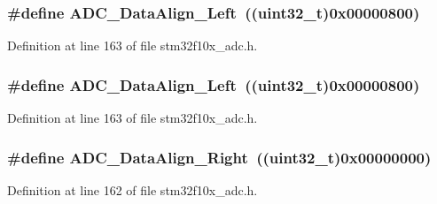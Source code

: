 \subsubsection[{\texorpdfstring{A\+D\+C\+\_\+\+Data\+Align\+\_\+\+Left}{ADC_DataAlign_Left}}]{\setlength{\rightskip}{0pt plus 5cm}\#define A\+D\+C\+\_\+\+Data\+Align\+\_\+\+Left~(({\bf uint32\+\_\+t})0x00000800)}\hypertarget{group___a_d_c__data__align_ga87c2b7021bc288174d5d6175dc267251}{}\label{group___a_d_c__data__align_ga87c2b7021bc288174d5d6175dc267251}


Definition at line 163 of file stm32f10x\+\_\+adc.\+h.

\subsubsection[{\texorpdfstring{A\+D\+C\+\_\+\+Data\+Align\+\_\+\+Left}{ADC_DataAlign_Left}}]{\setlength{\rightskip}{0pt plus 5cm}\#define A\+D\+C\+\_\+\+Data\+Align\+\_\+\+Left~(({\bf uint32\+\_\+t})0x00000800)}\hypertarget{group___a_d_c__data__align_ga87c2b7021bc288174d5d6175dc267251}{}\label{group___a_d_c__data__align_ga87c2b7021bc288174d5d6175dc267251}


Definition at line 163 of file stm32f10x\+\_\+adc.\+h.

\subsubsection[{\texorpdfstring{A\+D\+C\+\_\+\+Data\+Align\+\_\+\+Right}{ADC_DataAlign_Right}}]{\setlength{\rightskip}{0pt plus 5cm}\#define A\+D\+C\+\_\+\+Data\+Align\+\_\+\+Right~(({\bf uint32\+\_\+t})0x00000000)}\hypertarget{group___a_d_c__data__align_ga80b5d2f2b6b058bc498f58e0a92ad035}{}\label{group___a_d_c__data__align_ga80b5d2f2b6b058bc498f58e0a92ad035}


Definition at line 162 of file stm32f10x\+\_\+adc.\+h.

